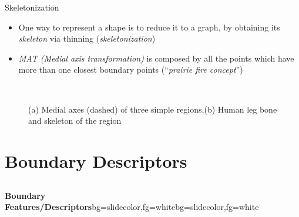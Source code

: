 \begin{frame}{Skeletonization}
\begin{itemize}
\item One way to represent a shape is to reduce it to a graph, by obtaining its \textit{\color{mycolor1}skeleton} via thinning (\textit{\color{mycolor1}skeletonization})
\item \textit{\color{mycolor2}MAT (Medial axis transformation)} is composed by all the points which have more than one 
closest boundary points (``\textit{\color{mycolor2}prairie fire concept}'')
\end{itemize}
\begin{figure}
~~~
\caption{(a) Medial axes (dashed) of three simple regions,(b) Human leg bone and skeleton of the region}
\end{figure}
\end{frame}

\section{Boundary Descriptors}
\subsection{}

\begin{frame}{}
\begin{variableblock}{\centering \Large \textbf{\vspace{4pt}\newline Boundary Features/Descriptors\vspace{4pt}}}{bg=slidecolor,fg=white}{bg=slidecolor,fg=white}
\end{variableblock}
\end{frame}

